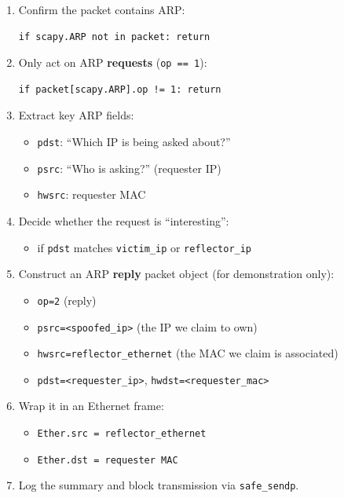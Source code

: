 \begin{enumerate}
\item Confirm the packet contains ARP:

\begin{verbatim}
if scapy.ARP not in packet: return
\end{verbatim}


\item Only act on ARP \textbf{requests} (\texttt{op == 1}):

\begin{verbatim}
if packet[scapy.ARP].op != 1: return
\end{verbatim}


\item Extract key ARP fields:

\begin{itemize}
\item \texttt{pdst}: ``Which IP is being asked about?''
\item \texttt{psrc}: ``Who is asking?'' (requester IP)
\item \texttt{hwsrc}: requester MAC
\end{itemize}


\item Decide whether the request is ``interesting'':

\begin{itemize}
\item if \texttt{pdst} matches \texttt{victim\_ip} or \texttt{reflector\_ip}
\end{itemize}


\item Construct an ARP \textbf{reply} packet object (for demonstration only):

\begin{itemize}
\item \texttt{op=2} (reply)
\item \texttt{psrc=\textless spoofed\_ip\textgreater } (the IP we claim to own)
\item \texttt{hwsrc=reflector\_ethernet} (the MAC we claim is associated)
\item \texttt{pdst=\textless requester\_ip\textgreater }, \texttt{hwdst=\textless requester\_mac\textgreater }
\end{itemize}


\item Wrap it in an Ethernet frame:

\begin{itemize}
\item \texttt{Ether.src = reflector\_ethernet}
\item \texttt{Ether.dst = requester MAC}
\end{itemize}


\item Log the summary and block transmission via \texttt{safe\_sendp}.
\end{enumerate}

